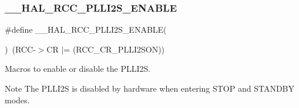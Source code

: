 \subsubsection{\texorpdfstring{\_\_HAL\_RCC\_PLLI2S\_ENABLE}{\_\_HAL\_RCC\_PLLI2S\_ENABLE}}
{\footnotesize\ttfamily \#define \+\_\+\+\_\+\+H\+A\+L\+\_\+\+R\+C\+C\+\_\+\+P\+L\+L\+I2\+S\+\_\+\+E\+N\+A\+B\+LE(\begin{DoxyParamCaption}{ }\end{DoxyParamCaption})~(R\+CC-\/$>$CR $\vert$= (R\+C\+C\+\_\+\+C\+R\+\_\+\+P\+L\+L\+I2\+S\+ON))}



Macros to enable or disable the P\+L\+L\+I2S. 

\begin{DoxyNote}{Note}
The P\+L\+L\+I2S is disabled by hardware when entering S\+T\+OP and S\+T\+A\+N\+D\+BY modes. 
\end{DoxyNote}
